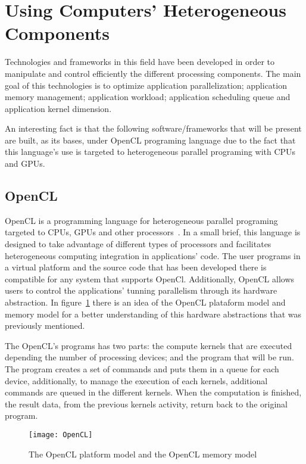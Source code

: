\section{Using Computers' Heterogeneous Components}\label{sec:dialecto}

Technologies and frameworks in this field have been developed in order to manipulate and control efficiently the different processing components. The main goal of this technologies is to optimize application parallelization; application memory management; application workload; application scheduling queue and application kernel dimension.

An interesting fact is that the following software/frameworks that will be present are built, as its bases, under OpenCL programing language due to the fact that this language's use is targeted to heterogeneous parallel programing with CPUs and GPUs.

\subsection{OpenCL}
OpenCL is a programming language for heterogeneous parallel programing targeted to CPUs, GPUs and other processors~\cite{Shen}. In a small brief,  this language is designed to take advantage of different types of processors and facilitates heterogeneous computing integration in applications' code. The user programs in a virtual platform and the source code that has been developed there is compatible for any system that supports OpenCl. Additionally, OpenCL allows users to control the applications' tunning parallelism through its hardware abstraction. In figure~\ref{fig:opcl} there is an idea of the OpenCL plataform model and memory model for a better understanding of this hardware abstractions that was previously mentioned.

The OpenCL's programs has two parts: the compute kernels that are executed depending the number of processing  devices; and the program that will be run. The program creates a set of commands and puts them in a queue for each device, additionally, to manage the execution of each kernels, additional commands are queued in the different kernels. When the computation is finished, the result data, from the previous kernels activity, return back to the original program. 

\begin{figure}[t]
  \begin{center}
    \leavevmode
    \texttt{[image: OpenCL]}
    \caption{The OpenCL platform model and the OpenCL memory model}
    \label{fig:opcl}
  \end{center}
\end{figure}


